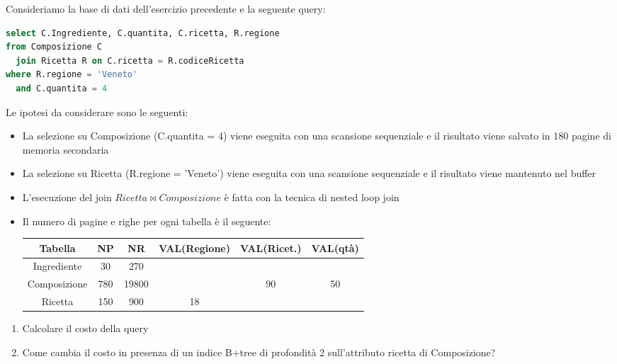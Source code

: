 \documentclass[a4paper,twoside]{article}
\begin{document}
\begin{exercise}
  Consideriamo la base di dati dell'esercizio precedente e la seguente query:
\begin{lstlisting}[language=sql]
select C.Ingrediente, C.quantita, C.ricetta, R.regione
from Composizione C
  join Ricetta R on C.ricetta = R.codiceRicetta
where R.regione = 'Veneto'
  and C.quantita = 4
\end{lstlisting}
  Le ipotesi da considerare sono le seguenti:
  \begin{itemize}
    \item La selezione su Composizione (C.quantita = 4) viene eseguita con una scansione 
      sequenziale e il risultato viene salvato
      in 180 pagine di memoria secondaria

    \item La selezione su Ricetta (R.regione = 'Veneto') viene eseguita con
      una scansione sequenziale e il risultato viene mantenuto nel buffer

    \item L'esecuzione del join \( Ricetta \bowtie Composizione \) è fatta
      con la tecnica di nested loop join

    \item Il numero di pagine e righe per ogni tabella è il seguente:
      \begin{table}[H]
        \centering
        \begin{tabular}{|c|c|c|c|c|c|}
          \hline
          Tabella & NP & NR & VAL(Regione) & VAL(Ricet.) & VAL(qtà) \\
          \hline
          Ingrediente  & 30  & 270   &    &    &    \\
          Composizione & 780 & 19800 &    & 90 & 50 \\
          Ricetta      & 150 & 900   & 18 &    &    \\
          \hline
        \end{tabular}
      \end{table}
  \end{itemize}

  \begin{enumerate}
    \item Calcolare il costo della query

    \item Come cambia il costo in presenza di un indice B+tree di profondità
      2 sull'attributo ricetta di Composizione?
  \end{enumerate}


\end{exercise}
\end{document}
